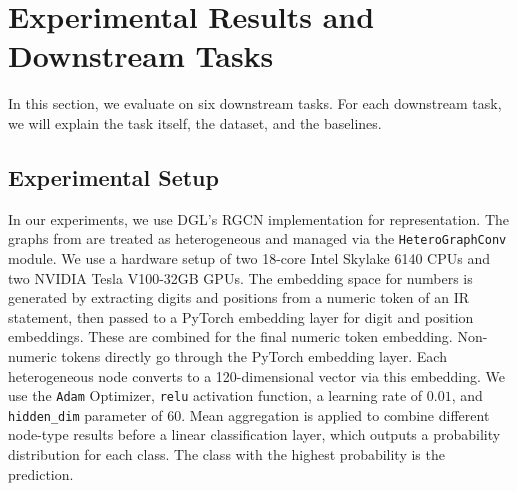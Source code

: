 \section{Experimental Results and Downstream Tasks}
\label{sec:results}
\vspace{-8pt}
In this section, we evaluate \ourtool on six downstream tasks.
For each downstream task, we will explain the task itself, the dataset, and the baselines.
\vspace{-4pt}
\subsection{Experimental Setup}
\vspace{-4pt}

In our experiments, we use DGL's \cite{wang2019deep} RGCN \cite{schlichtkrull2018modeling} implementation for \ourtool representation. The graphs from \ourtool are treated as heterogeneous and managed via the \texttt{HeteroGraphConv} module. We use a hardware setup of two 18-core Intel Skylake 6140 CPUs and two NVIDIA Tesla V100-32GB GPUs. The embedding space for numbers is generated by extracting digits and positions from a numeric token of an IR statement, then passed to a PyTorch \cite{NEURIPS2019_9015} embedding layer for digit and position embeddings. These are combined for the final numeric token embedding. Non-numeric tokens directly go through the PyTorch embedding layer. Each \ourtool heterogeneous node converts to a 120-dimensional vector via this embedding. We use the \texttt{Adam} \cite{kingma2014adam} Optimizer, \texttt{relu} \cite{agarap2018deep} activation function, a learning rate of $0.01$, and \texttt{hidden\_dim} parameter of $60$. Mean aggregation is applied to combine different node-type results before a linear classification layer, which outputs a probability distribution for each class. The class with the highest probability is the prediction.
\vspace{-4pt}

